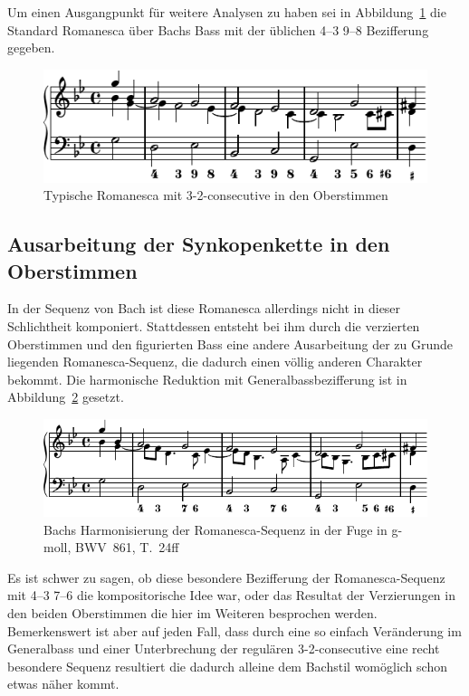 Um einen Ausgangpunkt für weitere Analysen zu haben sei in Abbildung~\ref{fig:bwv681-romanesca-standard} die Standard Romanesca über Bachs Bass mit der üblichen 4--3 9--8 Bezifferung gegeben.

\begin{figure}[htbp]
	\centering
	\includegraphics{lilypond/g-moll/render/romanesca-standard}
	\caption{Typische Romanesca mit 3-2-consecutive in den Oberstimmen}
	\label{fig:bwv681-romanesca-standard}
\end{figure}


\subsection{Ausarbeitung der Synkopenkette in den Oberstimmen}

In der Sequenz von Bach ist diese Romanesca allerdings nicht in dieser Schlichtheit komponiert.
Stattdessen entsteht bei ihm durch die verzierten Oberstimmen und den figurierten Bass eine andere Ausarbeitung der zu Grunde liegenden Romanesca-Sequenz, die dadurch einen völlig anderen Charakter bekommt.
Die harmonische Reduktion mit Generalbassbezifferung ist in Abbildung~\ref{fig:bwv681-vorhalte} gesetzt.

\begin{figure}[htbp]
	\centering
	\includegraphics{lilypond/g-moll/render/romanesca-vorhalte}
	\caption{Bachs Harmonisierung der Romanesca-Sequenz in der Fuge in g-moll, BWV~861, T.~24ff}
	\label{fig:bwv681-vorhalte}
\end{figure}

Es ist schwer zu sagen, ob diese besondere Bezifferung der Romanesca-Sequenz mit 4--3 7--6 die kompositorische Idee war, oder das Resultat der Verzierungen in den beiden Oberstimmen die hier im Weiteren besprochen werden.
Bemerkenswert ist aber auf jeden Fall, dass durch eine so einfach Veränderung im Generalbass und einer Unterbrechung der regulären 3-2-consecutive eine recht besondere Sequenz resultiert die dadurch alleine dem Bachstil womöglich schon etwas näher kommt.

